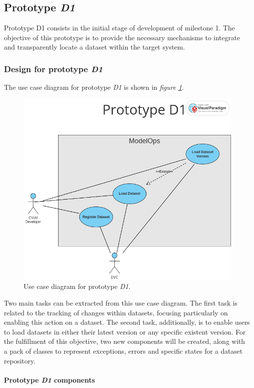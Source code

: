 \subsection{Prototype \emph{D1}}

Prototype D1 consists in the initial stage of development of milestone 1. The objective of this prototype is to 
provide the necessary mechanisms to integrate and transparently locate a dataset within the target system.

\subsubsection{Design for prototype \emph{D1}}

The use case diagram for prototype \emph{D1} is shown in \emph{figure \ref{fig:useCaseD1}}.

\begin{figure}[H]
    \centering
    \includegraphics[width=0.7\linewidth]{figs/use-case-D1.png}
    \caption{Use case diagram for prototype \emph{D1}.}
    \label{fig:useCaseD1}
\end{figure}

Two main tasks can be extracted from this use case diagram. The first task is related to the tracking of changes within datasets, focusing particularly on enabling this action on a 
dataset. The second task, additionally, is to enable users to load datasets in either their latest version or any specific existent version. For the fulfillment of 
this objective, two new components will be created, along with a pack of classes to represent exceptions, errors and specific states for a dataset repository.

\paragraph{Prototype \emph{D1} components}

